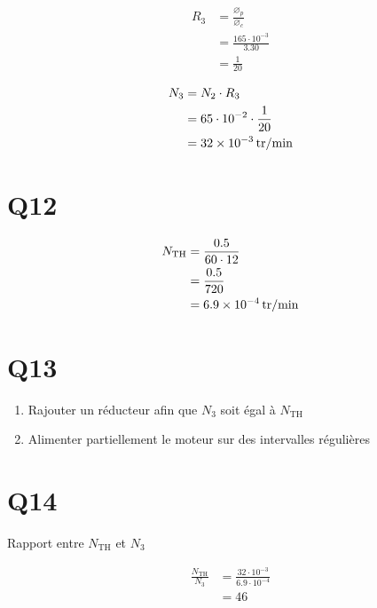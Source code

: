 \documentclass{article}
\newcommand{\rpm}{\text{tr}\per\minute}
\begin{document}
\begin{equation*}
  \begin{split}
    R_3 &= \frac{\diameter_p}{\diameter_c} \\
        &= \frac{165\cdot10^{-3}}{3.30} \\
        &= \frac{1}{20}
  \end{split}
\end{equation*}

\begin{equation*}
  \begin{split}
    N_3 &= N_2 \cdot R_3 \\
        &= 65\cdot10^{-2} \cdot \frac{1}{20} \\
        &= \SI{32E-3}{\rpm}
  \end{split}
\end{equation*}

\section{Q12}

\begin{equation*}
  \begin{split}
    N_{\text{TH}} &= \frac{0.5}{60 \cdot 12} \\
    &= \frac{0.5}{720} \\
    &= \SI{6.9E-4}{\rpm}
  \end{split}
\end{equation*}

\section{Q13}

\begin{enumerate}
  \item Rajouter un réducteur afin que $N_3$ soit égal à $N_{\text{TH}}$
  \item Alimenter partiellement le moteur sur des intervalles régulières
\end{enumerate}

\section{Q14}

Rapport entre $N_\text{TH}$ et $N_3$

\begin{equation*}
  \begin{split}
    \frac{N_\text{TH}}{N_3} &= \frac{32\cdot10^{-3}}{6.9\cdot10^{-4}} \\
                            &= 46
  \end{split}
\end{equation*}
\end{document}
